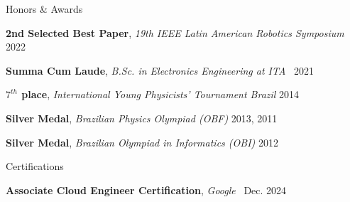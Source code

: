 \documentclass{resume} %
\begin{document}
\begin{rSection}{Honors \& Awards} \itemsep -2pt
\vspace{-7pt}
\item \textbf{2nd Selected Best Paper}, {\it 19th IEEE Latin American Robotics Symposium} \,\href{https://ieeexplore.ieee.org/document/9995828}{\faExternalLink} \hfill 2022%

\vspace{-2pt}

\item \textbf{Summa Cum Laude}, {\it B.Sc. in Electronics Engineering at ITA} \,\href{http://www.ita.br/grad/mencoes/honrosas}{\faExternalLink} \hfill 2021%

\vspace{-2pt}

\item \textbf{$7^{th}$ place}, {\it International Young Physicists' Tournament Brazil} \hfill 2014

\vspace{-2pt}


\item {\bf Silver Medal}, {\it Brazilian Physics Olympiad (OBF)} \hfill 2013, 2011

\vspace{-2pt}

\item {\bf Silver Medal}, {\it Brazilian Olympiad in Informatics (OBI)} \hfill 2012
\end{rSection}

\begin{rSection}{Certifications} \itemsep -2pt
\vspace{-7pt}
\item \textbf{Associate Cloud Engineer Certification}, {\it Google} \,\href{https://www.credly.com/badges/789cee67-d76d-44b7-8876-7e65a6d976fe/linked_in_profile}{\faExternalLink} \hfill Dec. 2024%

\vspace{-2pt}
\end{rSection}
\end{document}
